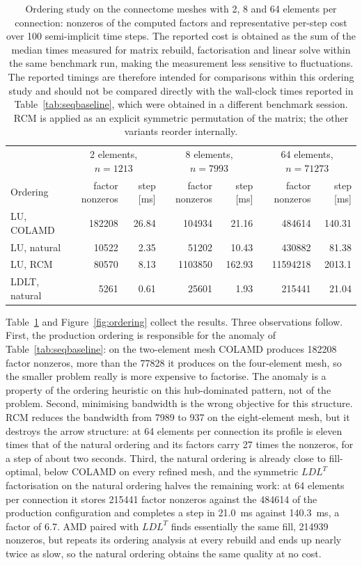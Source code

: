 \documentclass[11pt,a4paper]{article}
\begin{document}
\begin{table}[htbp]
\centering
\footnotesize
\begin{tabular}{lrrrrrr}
\hline
& \multicolumn{2}{c}{2 elements, $n=1213$}
& \multicolumn{2}{c}{8 elements, $n=7993$}
& \multicolumn{2}{c}{64 elements, $n=71273$} \\
Ordering & factor nonzeros & step [ms] & factor nonzeros & step [ms]
& factor nonzeros & step [ms] \\
\hline
LU, COLAMD      & 182208 & 26.84 & 104934  & 21.16  & 484614   & 140.31 \\
LU, natural     & 10522  & 2.35  & 51202   & 10.43  & 430882   & 81.38  \\
LU, RCM         & 80570  & 8.13  & 1103850 & 162.93 & 11594218 & 2013.1 \\
LDLT, natural   & 5261   & 0.61  & 25601   & 1.93   & 215441   & 21.04  \\
\hline
\end{tabular}
\caption{\footnotesize Ordering study on the connectome meshes with 2, 8
and 64 elements per connection: nonzeros of the computed factors and
representative per-step cost over 100 semi-implicit time steps. The reported
cost is obtained as the sum of the median times measured for matrix rebuild,
factorisation and linear solve within the same benchmark run, making the
measurement less sensitive to fluctuations. The reported timings are
therefore intended for comparisons within this ordering study and should not
be compared directly with the wall-clock times reported in
Table~\ref{tab:seqbaseline}, which were obtained in a different benchmark
session. RCM is applied as an explicit symmetric permutation of the matrix;
the other variants reorder internally.}
\label{tab:ordering}
\end{table}

Table~\ref{tab:ordering} and Figure~\ref{fig:ordering} collect the results.
Three observations follow. First, the production ordering is responsible
for the anomaly of Table~\ref{tab:seqbaseline}: on the two-element mesh
COLAMD produces 182208 factor nonzeros, more than the 77828 it produces on
the four-element mesh, so the smaller problem really is more expensive to
factorise. The anomaly is a property of the ordering heuristic on this
hub-dominated pattern, not of the problem. Second, minimising bandwidth is
the wrong objective for this structure. RCM reduces the bandwidth from 7989
to 937 on the eight-element mesh, but it destroys the arrow structure: at
64 elements per connection its profile is eleven times that of the natural
ordering and its factors carry 27 times the nonzeros, for a step of about
two seconds. Third, the natural ordering is already close to fill-optimal,
below COLAMD on every refined mesh, and the symmetric $LDL^{T}$
factorisation on the natural ordering halves the remaining work: at 64
elements per connection it stores 215441 factor nonzeros against the 484614
of the production configuration and completes a step in 21.0~ms against
140.3~ms, a factor of 6.7. AMD paired with $LDL^{T}$ finds essentially the
same fill, 214939 nonzeros, but repeats its ordering analysis at every
rebuild and ends up nearly twice as slow, so the natural ordering obtains
the same quality at no cost.
\end{document}
